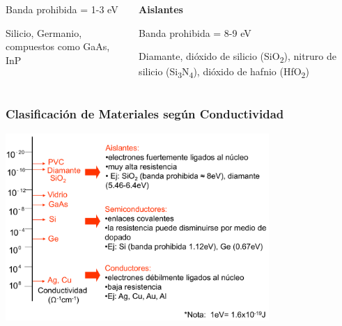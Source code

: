 \documentclass[10pt,t,aspectratio=169]{beamer}
\begin{document}
\begin{frame}[t]
\begin{columns}
\begin{column}{0.33\textwidth}
            Banda prohibida = 1-3 eV

            Silicio, Germanio, compuestos como GaAs, InP

        \end{column}
        \begin{column}{0.33\textwidth}
            \centering
            \textbf{Aislantes}
            
            \vspace{3mm}

            Banda prohibida = 8-9 eV

            Diamante, dióxido de silicio (SiO\textsubscript{2}), nitruro de silicio (Si\textsubscript{3}N\textsubscript{4}), dióxido de hafnio (HfO\textsubscript{2})

        \end{column}
    \end{columns}
\end{frame}


\begin{frame}[t]
    \frametitle{Clasificación de Materiales según Conductividad}

    \centering
    \includegraphics[width=10cm]{./figures/conductividad-materiales.pdf}
\end{frame}
\end{document}
